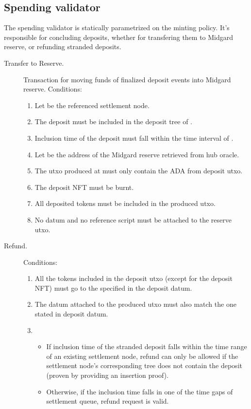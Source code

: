 \documentclass[../midgard.tex]{subfiles}
\begin{document}
\subsection{Spending validator}
\label{h:deposit-spending-validator}

The  spending validator is statically parametrized on the  minting policy.
It's responsible for concluding deposits, whether for transfering them to Midgard reserve, or refunding stranded deposits.

\begin{description}
  \item[Transfer to Reserve.] Transaction for moving funds of finalized deposit events into Midgard reserve.
    Conditions:
    \begin{enumerate}
      \item Let  be the referenced settlement node.
      \item The deposit must be included in the deposit tree of .
      \item Inclusion time of the deposit must fall within the time interval of .
      \item Let  be the address of the Midgard reserve retrieved from hub oracle.
      \item The utxo produced at  must only contain the ADA from deposit utxo.
      \item The deposit NFT must be burnt.
      \item All deposited tokens must be included in the produced utxo.
      \item No datum and no reference script must be attached to the reserve utxo.
    \end{enumerate}
  \item[Refund.] 
    Conditions:
    \begin{enumerate}
      \item All the tokens included in the deposit utxo (except for the deposit NFT) must go to the  specified in the deposit datum.
      \item The datum attached to the produced utxo must also match the one stated in deposit datum.
      \item 
        \begin{itemize}
          \item If inclusion time of the stranded deposit falls within the time range of an existing settlement node, refund can only be allowed if the settlement node's corresponding tree does not contain the deposit (proven by providing an insertion proof).
          \item Otherwise, if the inclusion time falls in one of the time gaps of settlement queue, refund request is valid.
        \end{itemize}
    \end{enumerate}
\end{description}
\end{document}
